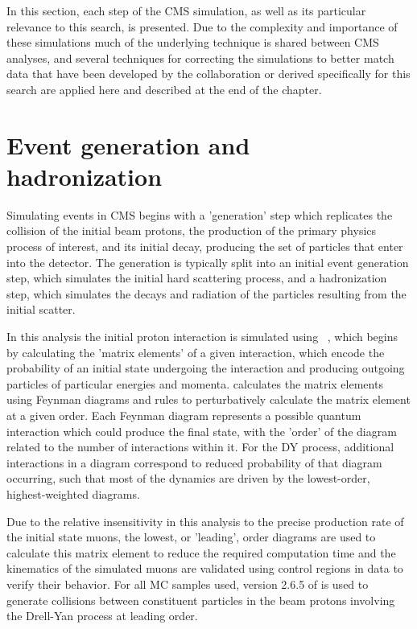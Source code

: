 In this section, each step of the CMS simulation, as well as its particular relevance to this search, is presented.
Due to the complexity and importance of these simulations much of the underlying technique is shared between CMS analyses, and several techniques for correcting the simulations to better match data that have been developed by the collaboration or derived specifically for this search are applied here and described at the end of the chapter. 

\section{Event generation and hadronization}
Simulating events in CMS begins with a 'generation' step which replicates the collision of the initial beam protons, the production of the primary physics process of interest, and its initial decay, producing the set of particles that enter into the detector. 
The generation is typically split into an initial event generation step, which simulates the initial hard scattering process, and a hadronization step, which simulates the decays and radiation of the particles resulting from the initial scatter.

In this analysis the initial proton interaction is simulated using \mg~\cite{Maltoni_2003}, which begins by calculating the 'matrix elements' of a given interaction, which encode the probability of an initial state undergoing the interaction and producing outgoing particles of particular energies and momenta.
\mg calculates the matrix elements using Feynman diagrams and rules to perturbatively calculate the matrix element at a given order.
Each Feynman diagram represents a possible quantum interaction which could produce the final state, with the 'order' of the diagram related to the number of interactions within it. 
For the DY process, additional interactions in a diagram correspond to reduced probability of that diagram occurring, such that most of the dynamics are driven by the lowest-order, highest-weighted diagrams.

Due to the relative insensitivity in this analysis to the precise production rate of the initial state muons, the lowest, or 'leading', order diagrams are used to calculate this matrix element to reduce the required computation time and the kinematics of the simulated muons are validated using control regions in data to verify their behavior.
For all MC samples used, version 2.6.5 of \mg is used to generate collisions between constituent particles in the beam protons involving the Drell-Yan process at leading order. 

